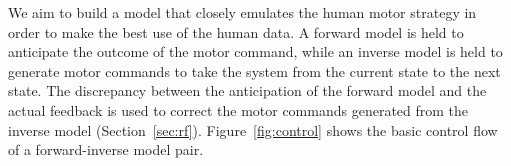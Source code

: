 



We aim to build a model that closely emulates the human motor strategy
in order to make the best use of the human data. A forward model is
held to anticipate the outcome of the motor command, while an inverse
model is held to generate motor commands to take the system from the
current state to the next state. The discrepancy between the
anticipation of the forward model and the actual feedback is used to
correct the motor commands generated from the inverse model
(Section~\ref{sec:rf}). Figure~\ref{fig:control} shows the basic
control flow of a forward-inverse model pair.

